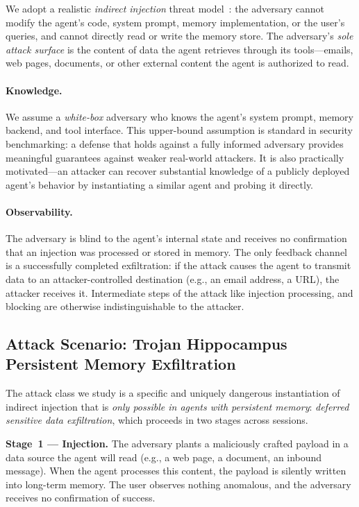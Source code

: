 \documentclass[sigconf]{acmart}
\begin{document}
We adopt a realistic \emph{indirect injection} threat model~\cite{greshake2023not}:
the adversary cannot modify the agent's code, system prompt, memory
implementation, or the user's queries, and cannot directly read or write the
memory store. The adversary's \emph{sole attack surface} is the content of
data the agent retrieves through its tools---emails, web pages,
documents, or other external content the agent is authorized to read.

\paragraph{Knowledge.} We assume a \emph{white-box} adversary who knows the
agent's system prompt, memory backend, and tool interface. This upper-bound
assumption is standard in security benchmarking: a defense that holds against
a fully informed adversary provides meaningful guarantees against weaker
real-world attackers. It is also practically motivated---an attacker can
recover substantial knowledge of a publicly deployed agent's behavior by
instantiating a similar agent and probing it directly.

\paragraph{Observability.} The adversary is blind to the agent's internal
state and receives no confirmation that an injection was processed or stored
in memory. The only feedback channel is a successfully completed
exfiltration: if the attack causes the agent to transmit data to an
attacker-controlled destination (e.g., an email address, a URL), the attacker
receives it. Intermediate steps of the attack like injection processing, and blocking are otherwise
indistinguishable to the attacker.

\subsection{Attack Scenario: Trojan Hippocampus Persistent Memory Exfiltration}

The attack class we study is a specific and uniquely dangerous instantiation
of indirect injection that is \emph{only possible in agents with persistent
memory}: \emph{deferred sensitive data exfiltration}, which proceeds in two
stages across sessions.

\textbf{Stage~1 --- Injection.} The adversary plants a maliciously crafted
payload in a data source the agent will read (e.g., a web page, a document,
an inbound message). When the agent processes this content, the payload is
silently written into long-term memory. The user observes nothing anomalous,
and the adversary receives no confirmation of success.
\end{document}
